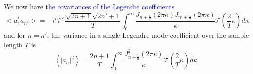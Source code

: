 \documentclass[10pt,preprint]{aastex631}
\newcommand{\jrmadd}[1]{\textcolor{blue}{#1}}
\begin{document}
We now have \jrmadd{the covariances of the Legendre coefficients}
\begin{equation}
<a_n^* a_{n'}> = -i^n i^{n'} \frac{\sqrt{2n+1}\sqrt{2n'+1}}{T}   \int_{0}^{\infty} \frac{J_{n+\frac{1}{2}}(2\pi \kappa) J_{n'+\frac{1}{2}}(2\pi \kappa)}{\kappa} \mathcal{T}\left( \frac{2}{T} \kappa \right) d\kappa
\end{equation}
and for $n = n'$, the variance in a single Legendre mode coefficient over the sample length $T$ is
\begin{equation}
\left\langle \left|a_n\right|^2 \right\rangle = \frac{2n+1}{T}  \int_0^{\infty} \frac{ J_{n+\frac{1}{2}}^2(2\pi \kappa)}{\kappa} \mathcal{T}\left( \frac{2}{T} \kappa \right) d\kappa.
\label{eqn:varcoeff}
\end{equation}



\end{document}
